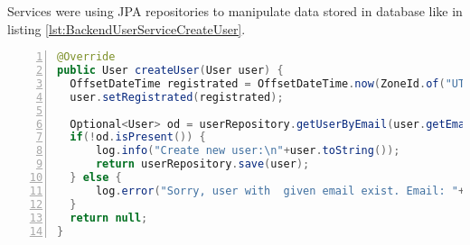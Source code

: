 Services were using JPA repositories to manipulate data stored in database like in listing \ref{lst:BackendUserServiceCreateUser}.
\begin{lstlisting}[breaklines=true, numbers=left, stepnumber=1, label={lst:BackendUserServiceCreateUser}, caption={User service create user},language=Java]
@Override
public User createUser(User user) {
  OffsetDateTime registrated = OffsetDateTime.now(ZoneId.of("UTC"));
  user.setRegistrated(registrated);
  
  Optional<User> od = userRepository.getUserByEmail(user.getEmail());
  if(!od.isPresent()) {
      log.info("Create new user:\n"+user.toString());
      return userRepository.save(user);
  } else {
      log.error("Sorry, user with  given email exist. Email: "+user.getEmail());
  }
  return null;
}	
\end{lstlisting}